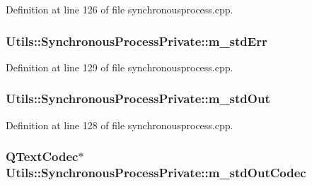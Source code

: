 \-Definition at line 126 of file synchronousprocess.\-cpp.

\hypertarget{struct_utils_1_1_synchronous_process_private_a91f0119521a74e8a136b01fee2e6bc2c}{
\subsubsection[{m\-\_\-std\-Err}]{ {\bf \-Utils\-::\-Synchronous\-Process\-Private\-::m\-\_\-std\-Err}}}\label{struct_utils_1_1_synchronous_process_private_a91f0119521a74e8a136b01fee2e6bc2c}


\-Definition at line 129 of file synchronousprocess.\-cpp.

\hypertarget{struct_utils_1_1_synchronous_process_private_a619a54cc495542f58dba37ea569d02df}{
\subsubsection[{m\-\_\-std\-Out}]{ {\bf \-Utils\-::\-Synchronous\-Process\-Private\-::m\-\_\-std\-Out}}}\label{struct_utils_1_1_synchronous_process_private_a619a54cc495542f58dba37ea569d02df}


\-Definition at line 128 of file synchronousprocess.\-cpp.

\hypertarget{struct_utils_1_1_synchronous_process_private_ae309539275cdf8ecf4189526058d2cb6}{
\subsubsection[{m\-\_\-std\-Out\-Codec}]{\setlength{\rightskip}{0pt plus 5cm}\-Q\-Text\-Codec$\ast$ {\bf \-Utils\-::\-Synchronous\-Process\-Private\-::m\-\_\-std\-Out\-Codec}}}\label{struct_utils_1_1_synchronous_process_private_ae309539275cdf8ecf4189526058d2cb6}


